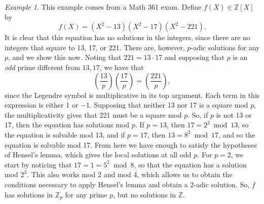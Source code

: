 \documentclass[12pt,twoside]{reedthesis}
\theoremstyle{plain}
\theoremstyle{definition}
\theoremstyle{remark}
\newtheorem{example}{Example}[section]
\newcommand{\ZZ}{\mathbb{Z}}
\begin{document}
\begin{example}
This example comes from a Math 361 exam. Define $f(X)\in\ZZ[X]$ by \[f(X)=(X^2-13)(X^2-17)(X^2-221).\] It is clear that this equation has no solutions in the integers, since there are no integers that square to 13, 17, or 221. There are, however, $p$-adic solutions for any $p$, and we show this now. Noting that $221=13\cdot 17$ and supposing that $p$ is an \emph{odd} prime different from $13,17$, we have that \[\left(\frac{13}{p}\right)\left(\frac{17}{p}\right)=\left(\frac{221}{p}\right),\] since the Legendre symbol is multiplicative in its top argument. Each term in this expression is either 1 or $-1$. Supposing that neither 13 nor 17 is a square mod $p$, the multiplicativity gives that 221 must be a square mod $p$. So, if $p$ is not 13 or 17, then the equation has solutions mod $p$. If $p=13$, then $17=2^2\bmod13$, so the equation is solvable mod 13, and if $p=17$, then $13=8^2\bmod17$, and so the equation is solvable mod 17. From here we have enough to satisfy the hypotheses of Hensel's lemma, which gives the local solutions at all odd $p$. For $p=2$, we start by noticing that $17=1=5^2\bmod 8$, so that the equation has a solution mod $2^3$. This also works mod 2 and mod 4, which allows us to obtain the conditions necessary to apply Hensel's lemma and obtain a 2-adic solution. So, $f$ has solutions in $\ZZ_p$ for any prime $p$, but no solutions in $\ZZ$.
\end{example}
\end{document}

